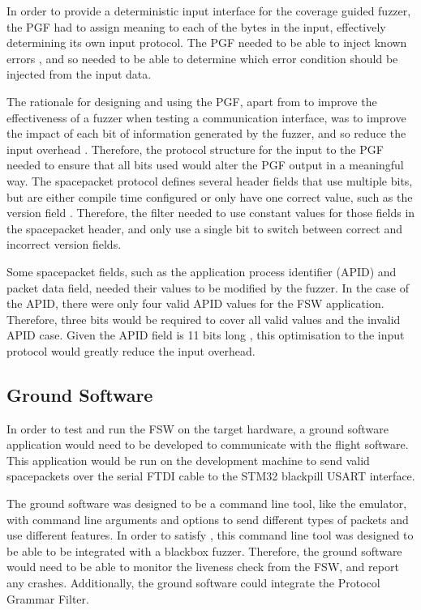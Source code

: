 \documentclass[../report.tex]{subfiles}
\begin{document}
In order to provide a deterministic input interface for the coverage guided
fuzzer, the PGF had to assign meaning to each of the bytes in the input,
effectively determining its own input protocol. The PGF needed to be able to
inject known errors , and so needed to be able to determine which
error condition should be injected from the input data.

The rationale for designing and using the PGF, apart from to improve the
effectiveness of a fuzzer when testing a communication interface, was to
improve the impact of each bit of information generated by the fuzzer, and so
reduce the input overhead \citep{Fuzzware_2022, Hoedur_2023,
Fuzztruction_2023}. Therefore, the protocol structure for the input to the PGF
needed to ensure that all bits used would alter the PGF output in a meaningful
way. The spacepacket protocol defines several header fields that use multiple
bits, but are either compile time configured or only have one correct value,
such as the version field \citep{Ccsds_spp}. Therefore, the filter needed to
use constant values for those fields in the spacepacket header, and only use a
single bit to switch between correct and incorrect version fields.

Some spacepacket fields, such as the application process identifier (APID) and
packet data field, needed their values to be modified by the fuzzer. In the
case of the APID, there were only four valid APID values for the FSW
application. Therefore, three bits would be required to cover all valid values
and the invalid APID case. Given the APID field is 11 bits long
\citep{Ccsds_spp}, this optimisation to the input protocol would greatly reduce
the input overhead.

\subsection{Ground Software}

In order to test and run the FSW on the target hardware, a ground software
application would need to be developed to communicate with the flight software.
This application would be run on the development machine to send valid
spacepackets over the serial FTDI cable to the STM32 blackpill USART interface.

The ground software was designed to be a command line tool, like the emulator,
with command line arguments and options to send different types of packets and
use different features. In order to satisfy , this command line
tool was designed to be able to be integrated with a blackbox fuzzer.
Therefore, the ground software would need to be able to monitor the liveness
check from the FSW, and report any crashes. Additionally, the ground software
could integrate the Protocol Grammar Filter.
\end{document}
